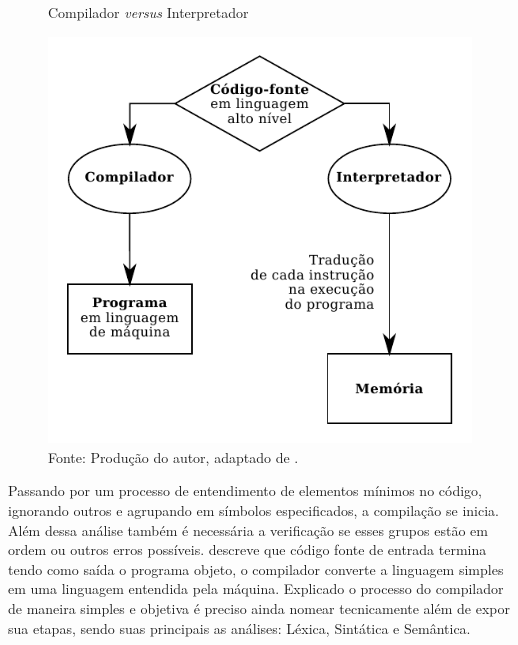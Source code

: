 \begin{figure}[h]
  \caption{\ifdraft{\color{green}}{}Compilador \textit{versus} Interpretador}\label{fig:versus}
  \centering
\includegraphics[width=\textwidth,keepaspectratio]{figures/compilador-interpretador.pdf}
  \caption*{\ifdraft{\color{green}}{}\footnotesize Fonte: Produção do autor, adaptado de .}
\end{figure}

Passando por um processo de entendimento de elementos mínimos no código, ignorando outros e agrupando em símbolos especificados, a compilação se inicia. Além dessa análise também é necessária a verificação se esses grupos estão em ordem ou outros erros possíveis.  descreve que código fonte de entrada termina tendo como saída o programa objeto, o compilador converte a linguagem simples em uma linguagem entendida pela máquina. Explicado o processo do compilador de maneira simples e objetiva é preciso ainda nomear tecnicamente além de expor sua etapas, sendo suas principais as análises: Léxica, Sintática e Semântica.

